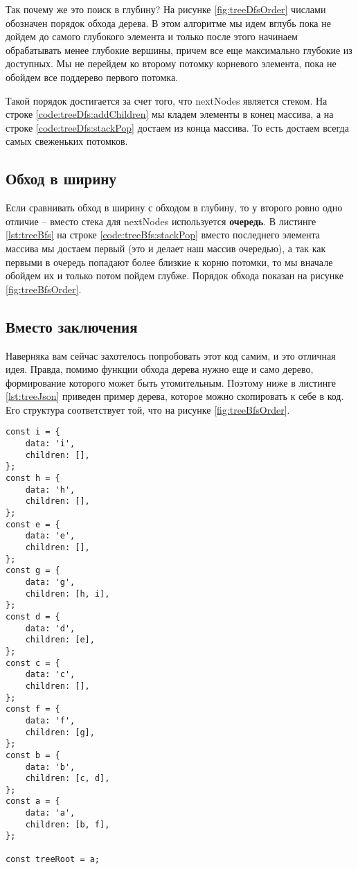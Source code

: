 \documentclass[../../article]{subfiles}
\begin{document}
Так почему же это поиск в глубину? На рисунке \ref{fig:treeDfsOrder} числами обозначен порядок обхода дерева. В этом алгоритме мы идем вглубь пока не дойдем до самого глубокого элемента и только после этого начинаем обрабатывать менее глубокие вершины, причем все еще максимально глубокие из доступных. Мы не перейдем ко второму потомку корневого элемента, пока не обойдем все поддерево первого потомка.

Такой порядок достигается за счет того, что {\firacodebold nextNodes} является стеком. На строке \ref{code:treeDfs:addChildren} мы кладем элементы в конец массива, а на строке \ref{code:treeDfs:stackPop} достаем из конца массива. То есть достаем всегда самых свеженьких потомков.

\subsection{Обход в ширину}

Если сравнивать обход в ширину с обходом в глубину, то у второго ровно одно отличие – вместо стека для {\firacodebold nextNodes} используется {\bfseries очередь}. В листинге \ref{lst:treeBfs} на строке \ref{code:treeBfs:stackPop} вместо последнего элемента массива мы достаем первый (это и делает наш массив очередью), а так как первыми в очередь попадают более близкие к корню потомки, то мы вначале обойдем их и только потом пойдем глубже. Порядок обхода показан на рисунке \ref{fig:treeBfsOrder}.

\subsection{Вместо заключения}
Наверняка вам сейчас захотелось попробовать этот код самим, и это отличная идея. Правда, помимо функции обхода дерева нужно еще и само дерево, формирование которого может быть утомительным. Поэтому ниже в листинге \ref{lst:treeJson} приведен пример дерева, которое можно скопировать к себе в код. Его структура соответствует той, что на рисунке \ref{fig:treeBfsOrder}.

\begin{ruledelement}
    \begin{lstlisting}[caption={Пример {\firacodebold treeRoot}}, label={lst:treeJson}]
const i = {
    data: 'i',
    children: [],
};
const h = {
    data: 'h',
    children: [],
};
const e = {
    data: 'e',
    children: [],
};
const g = {
    data: 'g',
    children: [h, i],
};
const d = {
    data: 'd',
    children: [e],
};
const c = {
    data: 'c',
    children: [],
};
const f = {
    data: 'f',
    children: [g],
};
const b = {
    data: 'b',
    children: [c, d],
};
const a = {
    data: 'a',
    children: [b, f],
};

const treeRoot = a;
    \end{lstlisting}
\end{ruledelement}
\end{document}
